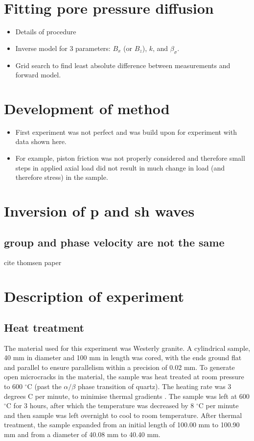 \section{Fitting pore pressure diffusion}
\begin{itemize}
    \item Details of procedure
    \item Inverse model for 3 parameters: $B_x$ (or $B_z$), $k$, and $\beta_{\sigma}$.
    \item Grid search to find least absolute difference between measurements and forward model.
\end{itemize}

\section{Development of method}
\begin{itemize}
    \item First experiment was not perfect and was build upon for experiment with data shown here.
    \item For example, piston friction was not properly considered and therefore small steps in applied axial load did not result in much change in load (and therefore stress) in the sample.
\end{itemize}

\section{Inversion of p and sh waves}
\subsection{group and phase velocity are not the same}
cite thomsen paper


\section{Description of experiment}
\subsection{Heat treatment}
The material used for this experiment was Westerly granite. A cylindrical sample, 40 mm in diameter and 100 mm in length was cored, with the ends ground flat and parallel to ensure parallelism within a precision of 0.02 mm. To generate open microcracks in the material, the sample was heat treated at room pressure to 600 $^{\circ}$C (past the $\alpha / \beta$ phase transition of quartz). The heating rate was 3 degrees C per minute, to minimise thermal gradients \citep{Wang2013}. The sample was left at 600 $^{\circ}$C for 3 hours, after which the temperature was decreased by 8 $^{\circ}$C per minute and then sample was left overnight to cool to room temperature. After thermal treatment, the sample expanded from an initial length of 100.00 mm to 100.90 mm and from a diameter of 40.08 mm to 40.40 mm.
